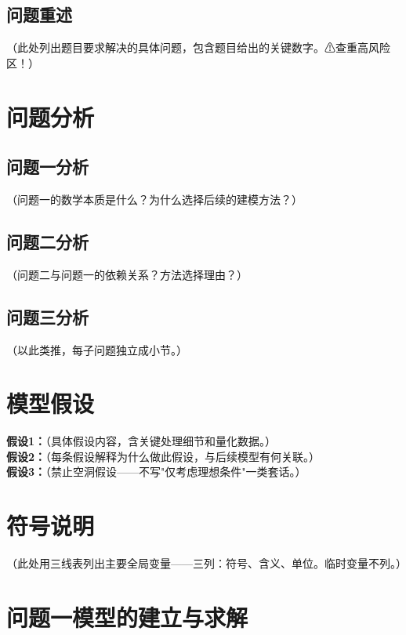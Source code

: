 \documentclass[12pt,a4paper]{article}
\numberwithin{equation}{section}
\numberwithin{figure}{section}
\numberwithin{table}{section}
\begin{document}
\subsection{问题重述}
（此处列出题目要求解决的具体问题，包含题目给出的关键数字。⚠查重高风险区！）

\section{问题分析}
\subsection{问题一分析}
（问题一的数学本质是什么？为什么选择后续的建模方法？）

\subsection{问题二分析}
（问题二与问题一的依赖关系？方法选择理由？）

\subsection{问题三分析}
（以此类推，每子问题独立成小节。）


\section{模型假设}
\textbf{假设1：}（具体假设内容，含关键处理细节和量化数据。）\\
\textbf{假设2：}（每条假设解释为什么做此假设，与后续模型有何关联。）\\
\textbf{假设3：}（禁止空洞假设——不写"仅考虑理想条件"一类套话。）

\section{符号说明}
（此处用三线表列出主要全局变量——三列：符号、含义、单位。临时变量不列。）

\section{问题一模型的建立与求解}
\end{document}
